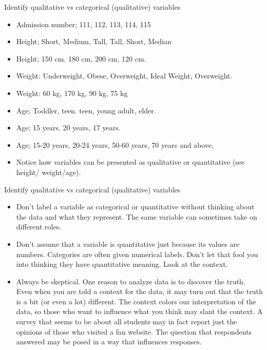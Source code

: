 \documentclass[
  ignorenonframetext,
]{beamer}
\providecommand{\tightlist}{%
  \setlength{\itemsep}{0pt}\setlength{\parskip}{0pt}}
\begin{document}
\begin{frame}{Identify qualitative vs categorical (qualitative)
variables}
\protect\hypertarget{identify-qualitative-vs-categorical-qualitative-variables}{}
\begin{itemize}
\item
  Admission number; 111, 112, 113, 114, 115
\item
  Height; Short, Medium, Tall, Tall, Short, Median
\item
  Height; 150 cm. 180 cm, 200 cm, 120 cm.
\item
  Weight: Underweight, Obese, Overweight, Ideal Weight, Overweight.
\item
  Weight: 60 kg, 170 kg, 90 kg, 75 kg
\item
  Age; Toddler, teen. teen, young adult, elder.
\item
  Age; 15 years, 20 years, 17 years.
\item
  Age; 15-20 years, 20-24 years, 50-60 years, 70 years and above.
\item
  Notice how variables can be presented as qualitative or quantitative
  (see height/ weight/age).
\end{itemize}
\end{frame}

\begin{frame}{Identify qualitative vs categorical (qualitative)
variables}
\protect\hypertarget{identify-qualitative-vs-categorical-qualitative-variables-1}{}
\begin{itemize}
\tightlist
\item
  Don't label a variable as categorical or quantitative without thinking
  about the data and what they represent. The same variable can
  sometimes take on different roles.
\item
  Don't assume that a variable is quantitative just because its values
  are numbers. Categories are often given numerical labels. Don't let
  that fool you into thinking they have quantitative meaning. Look at
  the context.
\item
  Always be skeptical. One reason to analyze data is to discover the
  truth. Even when you are told a context for the data, it may turn out
  that the truth is a bit (or even a lot) different. The context colors
  our interpretation of the data, so those who want to influence what
  you think may slant the context. A survey that seems to be about all
  students may in fact report just the opinions of those who visited a
  fan website. The question that respondents answered may be posed in a
  way that influences responses.
\end{itemize}
\end{frame}
\end{document}
